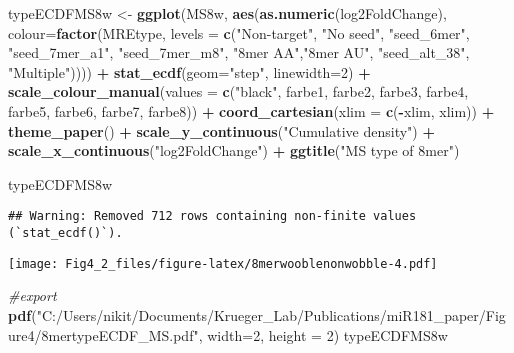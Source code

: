 \documentclass[
]{article}
\newenvironment{Shaded}{\begin{snugshade}}{\end{snugshade}}
\newcommand{\AttributeTok}[1]{\textcolor[rgb]{0.13,0.29,0.53}{#1}}
\newcommand{\CommentTok}[1]{\textcolor[rgb]{0.56,0.35,0.01}{\textit{#1}}}
\newcommand{\DecValTok}[1]{\textcolor[rgb]{0.00,0.00,0.81}{#1}}
\newcommand{\FunctionTok}[1]{\textcolor[rgb]{0.13,0.29,0.53}{\textbf{#1}}}
\newcommand{\NormalTok}[1]{#1}
\newcommand{\OtherTok}[1]{\textcolor[rgb]{0.56,0.35,0.01}{#1}}
\newcommand{\SpecialCharTok}[1]{\textcolor[rgb]{0.81,0.36,0.00}{\textbf{#1}}}
\newcommand{\StringTok}[1]{\textcolor[rgb]{0.31,0.60,0.02}{#1}}
\begin{document}
\begin{Shaded}
\begin{Highlighting}[]
\NormalTok{typeECDFMS8w }\OtherTok{\textless{}{-}} \FunctionTok{ggplot}\NormalTok{(MS8w, }\FunctionTok{aes}\NormalTok{(}\FunctionTok{as.numeric}\NormalTok{(log2FoldChange), }
                              \AttributeTok{colour=}\FunctionTok{factor}\NormalTok{(MREtype, }\AttributeTok{levels =} \FunctionTok{c}\NormalTok{(}\StringTok{"Non{-}target"}\NormalTok{, }\StringTok{"No seed"}\NormalTok{, }\StringTok{"seed\_6mer"}\NormalTok{, }\StringTok{"seed\_7mer\_a1"}\NormalTok{, }\StringTok{"seed\_7mer\_m8"}\NormalTok{, }\StringTok{"8mer AA"}\NormalTok{,}\StringTok{"8mer AU"}\NormalTok{, }\StringTok{"seed\_alt\_38"}\NormalTok{, }\StringTok{"Multiple"}\NormalTok{)))) }\SpecialCharTok{+} 
  \FunctionTok{stat\_ecdf}\NormalTok{(}\AttributeTok{geom=}\StringTok{"step"}\NormalTok{, }\AttributeTok{linewidth=}\DecValTok{2}\NormalTok{) }\SpecialCharTok{+}
  \FunctionTok{scale\_colour\_manual}\NormalTok{(}\AttributeTok{values =} \FunctionTok{c}\NormalTok{(}\StringTok{"black"}\NormalTok{, farbe1, farbe2, farbe3, farbe4, farbe5, farbe6, farbe7, farbe8)) }\SpecialCharTok{+}
  \FunctionTok{coord\_cartesian}\NormalTok{(}\AttributeTok{xlim =} \FunctionTok{c}\NormalTok{(}\SpecialCharTok{{-}}\NormalTok{xlim, xlim)) }\SpecialCharTok{+} 
  \FunctionTok{theme\_paper}\NormalTok{() }\SpecialCharTok{+}
  \FunctionTok{scale\_y\_continuous}\NormalTok{(}\StringTok{"Cumulative density"}\NormalTok{) }\SpecialCharTok{+} \FunctionTok{scale\_x\_continuous}\NormalTok{(}\StringTok{"log2FoldChange"}\NormalTok{) }\SpecialCharTok{+}
  \FunctionTok{ggtitle}\NormalTok{(}\StringTok{"MS type of 8mer"}\NormalTok{)}

\NormalTok{typeECDFMS8w}
\end{Highlighting}
\end{Shaded}

\begin{verbatim}
## Warning: Removed 712 rows containing non-finite values (`stat_ecdf()`).
\end{verbatim}

\texttt{[image: Fig4\_2\_files/figure-latex/8merwooblenonwobble-4.pdf]}

\begin{Shaded}
\begin{Highlighting}[]
\CommentTok{\#export}
\FunctionTok{pdf}\NormalTok{(}\StringTok{"C:/Users/nikit/Documents/Krueger\_Lab/Publications/miR181\_paper/Figure4/8mertypeECDF\_MS.pdf"}\NormalTok{, }\AttributeTok{width=}\DecValTok{2}\NormalTok{, }\AttributeTok{height =} \DecValTok{2}\NormalTok{)}
\NormalTok{typeECDFMS8w}
\end{Highlighting}
\end{Shaded}
\end{document}
